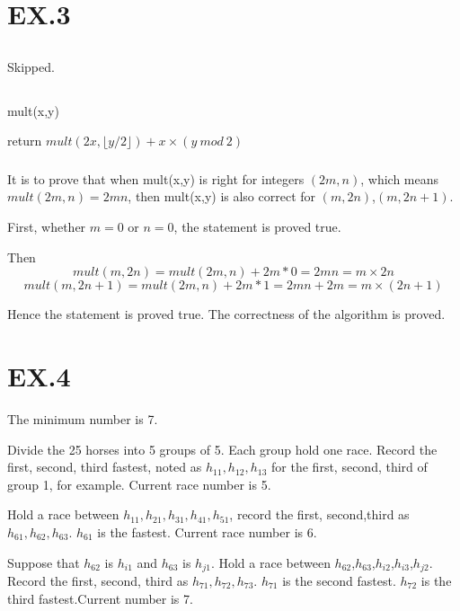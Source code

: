 \documentclass[12pt,a4paper]{article}
\theoremstyle{definition}
\begin{document}
\section{EX.3}
\subsection{}
    Skipped.
\subsection{}
	\subsubsection{}
    \begin{algorithm}[H]
        \BlankLine
    	\caption{mult(x,y)}\label{mult}
    	\BlankLine
    	return $mult(2x,\lfloor y/2 \rfloor)+x \times (y \ mod \ 2)$
	\end{algorithm}
\newpage
	\subsubsection{}
		\par It is to prove that when mult(x,y) is right for integers $(2m,n)$, which means $mult(2m,n)=2mn$, then mult(x,y) is also correct for $(m,2n)$,$(m,2n+1)$.
		\par First, whether $m=0$ or $n=0$, the statement is proved true.
		\par Then
		$$
			mult(m,2n) = mult(2m,n)+ 2m*0 = 2mn=m \times 2n
		$$
		$$
			mult(m,2n+1) = mult(2m,n)+ 2m*1 = 2mn+2m = m \times (2n+1)
		$$
		\par Hence the statement is proved true. The correctness of the algorithm is proved.
\section{EX.4}
    \par The minimum number is 7.
    \par Divide the 25 horses into 5 groups of 5. Each group hold one race. Record the first, second, third fastest, noted as $h_{11},h_{12},h_{13}$ for the first, second, third of group 1, for example. Current race number is 5.
    \par Hold a race between $h_{11},h_{21},h_{31},h_{41},h_{51}$, record the first, second,third as $h_{61},h_{62},h_{63}$. $h_{61}$ is the fastest. Current race number is 6.
    \par Suppose that $h_{62}$ is $h_{i1}$ and  $h_{63}$ is $h_{j1}$. Hold a race between $h_{62}$,$h_{63}$,$h_{i2}$,$h_{i3}$,$h_{j2}$. Record the first, second, third as $h_{71},h_{72},h_{73}$. $h_{71}$ is the second fastest. $h_{72}$ is the third fastest.Current number is 7.
    
\end{document}
